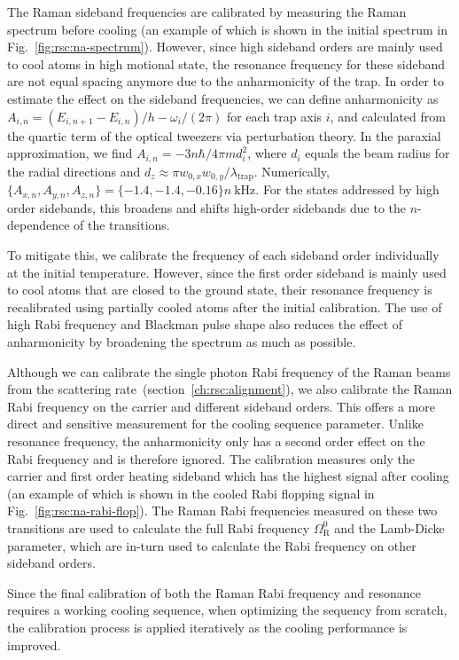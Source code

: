 The Raman sideband frequencies are calibrated by measuring the Raman spectrum before cooling
(an example of which is shown in the initial spectrum in Fig.~\ref{fig:rsc:na-spectrum}).
However, since high sideband orders are mainly used to cool atoms in high motional state,
the resonance frequency for these sideband are not equal spacing anymore due to
the anharmonicity of the trap.
In order to estimate the effect on the sideband frequencies,
we can define anharmonicity as $A_{i,n}=(E_{i,n+1}-E_{i,n})/h - \omega_i/(2\pi)$
for each trap axis $i$, and calculated from the quartic term
of the optical tweezers via perturbation theory.
In the paraxial approximation, we find $A_{i,n}=-3n\hbar/4\pi m d_i^2$,
where $d_i$ equals the beam radius for the radial directions and
$d_z\approx\pi w_{0,x}w_{0,y}/\lambda_{\textrm{trap}}$.
Numerically, $\{A_{x,n},A_{y,n},A_{z,n}\}=\{-1.4, -1.4, -0.16\}n~\mathrm{kHz}$.
For the states addressed by high order sidebands,
this broadens and shifts high-order sidebands
due to the $n$-dependence of the transitions.

To mitigate this, we calibrate the frequency of each sideband order individually
at the initial temperature. However, since the first order sideband is mainly used to cool atoms
that are closed to the ground state,
their resonance frequency  is recalibrated using partially cooled atoms after the initial calibration.
The use of high Rabi frequency and Blackman pulse shape also reduces the effect
of anharmonicity by broadening the spectrum as much as possible.

Although we can calibrate the single photon Rabi frequency of the Raman beams from
the scattering rate~(section~\ref{ch:rsc:alignment}),
we also calibrate the Raman Rabi frequency on the carrier and different sideband orders.
This offers a more direct and sensitive measurement for the cooling sequence parameter.
Unlike resonance frequency, the anharmonicity only has a second order effect on the Rabi frequency
and is therefore ignored. The calibration measures
only the carrier and first order heating sideband which has the highest signal after cooling
(an example of which is shown in the cooled Rabi flopping signal in
Fig.~\ref{fig:rsc:na-rabi-flop}).
The Raman Rabi frequencies measured on these two transitions are used to calculate
the full Rabi frequency $\Omega_{\mathrm{R}}^0$ and the Lamb-Dicke parameter,
which are in-turn used to calculate the Rabi frequency on other sideband orders.

Since the final calibration of both the Raman Rabi frequency and resonance requires a working
cooling sequence, when optimizing the sequency from scratch,
the calibration process is applied iteratively as the cooling performance is improved.

